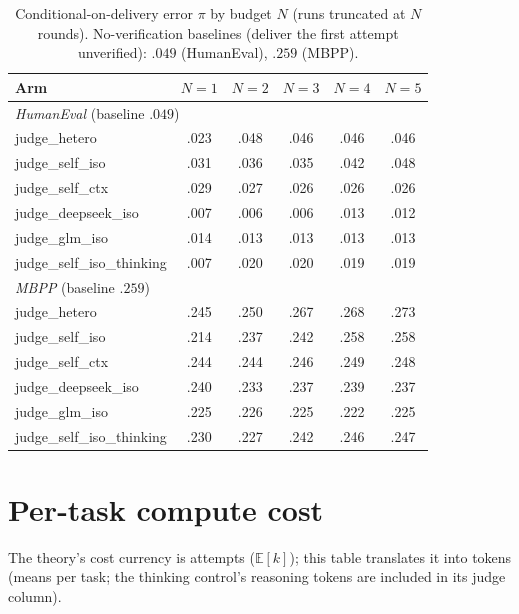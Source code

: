 \documentclass[10pt]{article}
\begin{document}
\begin{table}[htbp]
\centering\small
\caption{Conditional-on-delivery error $\pi$ by budget $N$
(runs truncated at $N$ rounds).  No-verification baselines
(deliver the first attempt unverified): $.049$ (HumanEval),
$.259$ (MBPP).}
\label{tab:budget}
\begin{tabular}{lccccc}
\toprule
Arm & $N{=}1$ & $N{=}2$ & $N{=}3$ & $N{=}4$ & $N{=}5$\\
\midrule
\multicolumn{6}{l}{\emph{HumanEval} (baseline $.049$)}\\
judge\_hetero & .023 & .048 & .046 & .046 & .046\\
judge\_self\_iso & .031 & .036 & .035 & .042 & .048\\
judge\_self\_ctx & .029 & .027 & .026 & .026 & .026\\
judge\_deepseek\_iso & .007 & .006 & .006 & .013 & .012\\
judge\_glm\_iso & .014 & .013 & .013 & .013 & .013\\
judge\_self\_iso\_thinking & .007 & .020 & .020 & .019 & .019\\
\midrule
\multicolumn{6}{l}{\emph{MBPP} (baseline $.259$)}\\
judge\_hetero & .245 & .250 & .267 & .268 & .273\\
judge\_self\_iso & .214 & .237 & .242 & .258 & .258\\
judge\_self\_ctx & .244 & .244 & .246 & .249 & .248\\
judge\_deepseek\_iso & .240 & .233 & .237 & .239 & .237\\
judge\_glm\_iso & .225 & .226 & .225 & .222 & .225\\
judge\_self\_iso\_thinking & .230 & .227 & .242 & .246 & .247\\
\bottomrule
\end{tabular}
\end{table}

\section{Per-task compute cost}\label{app:cost}

The theory's cost currency is attempts ($\mathbb{E}[k]$); this
table translates it into tokens (means per task; the thinking
control's reasoning tokens are included in its judge column).
\end{document}
